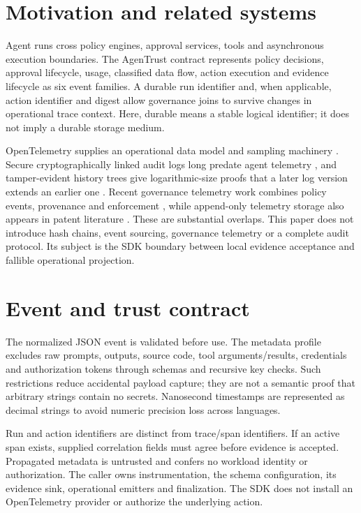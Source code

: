 \documentclass[10pt,letterpaper]{article}
\begin{document}
\section{Motivation and related systems}

Agent runs cross policy engines, approval services, tools and asynchronous execution boundaries. The AgenTrust contract represents policy decisions, approval lifecycle, usage, classified data flow, action execution and evidence lifecycle as six event families. A durable run identifier and, when applicable, action identifier and digest allow governance joins to survive changes in operational trace context. Here, durable means a stable logical identifier; it does not imply a durable storage medium.


OpenTelemetry supplies an operational data model and sampling machinery \cite{ref1}. Secure cryptographically linked audit logs long predate agent telemetry \cite{ref2}, and tamper-evident history trees give logarithmic-size proofs that a later log version extends an earlier one \cite{ref8}. Recent governance telemetry work combines policy events, provenance and enforcement \cite{ref3}, while append-only telemetry storage also appears in patent literature \cite{ref4}. These are substantial overlaps. This paper does not introduce hash chains, event sourcing, governance telemetry or a complete audit protocol. Its subject is the SDK boundary between local evidence acceptance and fallible operational projection.


\section{Event and trust contract}

The normalized JSON event is validated before use. The metadata profile excludes raw prompts, outputs, source code, tool arguments/results, credentials and authorization tokens through schemas and recursive key checks. Such restrictions reduce accidental payload capture; they are not a semantic proof that arbitrary strings contain no secrets. Nanosecond timestamps are represented as decimal strings to avoid numeric precision loss across languages.


Run and action identifiers are distinct from trace/span identifiers. If an active span exists, supplied correlation fields must agree before evidence is accepted. Propagated metadata is untrusted and confers no workload identity or authorization. The caller owns instrumentation, the schema configuration, its evidence sink, operational emitters and finalization. The SDK does not install an OpenTelemetry provider or authorize the underlying action.
\end{document}
